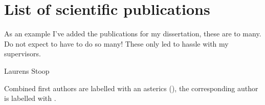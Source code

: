 
\chapter{List of scientific publications}
\label{ch:publications}


\epigraph{As an example I've added the publications for my dissertation, these are to many. Do not expect to have to do so many! These only led to hassle with my supervisors.}{Laurens Stoop}

Combined first authors are labelled with an asterics (\Writinghand), the corresponding author is labelled with \Letter.


